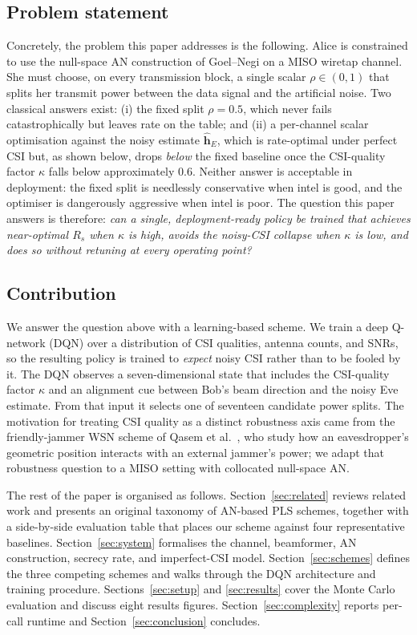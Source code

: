 \documentclass[conference]{IEEEtran}
\begin{document}
\subsection{Problem statement}

Concretely, the problem this paper addresses is the following. Alice
is constrained to use the null-space AN construction of Goel--Negi
\cite{goel2008guaranteeing} on a MISO wiretap channel. She must
choose, on every transmission block, a single scalar $\rho \in (0, 1)$
that splits her transmit power between the data signal and the
artificial noise. Two classical answers exist: (i) the fixed split
$\rho = 0.5$, which never fails catastrophically but leaves rate on
the table; and (ii) a per-channel scalar optimisation against the
noisy estimate $\hat{\mathbf{h}}_E$, which is rate-optimal under
perfect CSI but, as shown below, drops \emph{below} the fixed
baseline once the CSI-quality factor $\kappa$ falls below
approximately $0.6$. Neither answer is acceptable in deployment: the
fixed split is needlessly conservative when intel is good, and the
optimiser is dangerously aggressive when intel is poor. The question
this paper answers is therefore: \emph{can a single, deployment-ready
policy be trained that achieves near-optimal $R_s$ when $\kappa$ is
high, avoids the noisy-CSI collapse when $\kappa$ is low, and does so
without retuning at every operating point?}

\subsection{Contribution}

We answer the question above with a learning-based scheme. We train a
deep Q-network (DQN) \cite{mnih2015human, sutton2018rl} over a
distribution of CSI qualities, antenna counts, and SNRs, so the
resulting policy is trained to \emph{expect} noisy CSI rather than to
be fooled by it. The DQN observes a seven-dimensional state that
includes the CSI-quality factor $\kappa$ and an alignment cue between
Bob's beam direction and the noisy Eve estimate. From that input it
selects one of seventeen candidate power splits. The motivation for
treating CSI quality as a distinct robustness axis came from the
friendly-jammer WSN scheme of Qasem et al.\ \cite{qasem2024pls}, who
study how an eavesdropper's geometric position interacts with an
external jammer's power; we adapt that robustness question to a MISO
setting with collocated null-space AN.

The rest of the paper is organised as follows.
Section~\ref{sec:related} reviews related work and presents an
original taxonomy of AN-based PLS schemes, together with a side-by-side
evaluation table that places our scheme against four representative
baselines. Section~\ref{sec:system} formalises the channel,
beamformer, AN construction, secrecy rate, and imperfect-CSI model.
Section~\ref{sec:schemes} defines the three competing schemes and
walks through the DQN architecture and training procedure.
Sections~\ref{sec:setup} and \ref{sec:results} cover the Monte Carlo
evaluation and discuss eight results figures.
Section~\ref{sec:complexity} reports per-call runtime and
Section~\ref{sec:conclusion} concludes.
\end{document}
